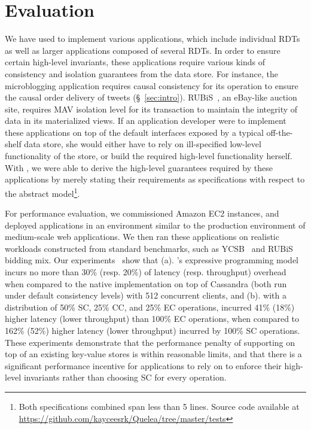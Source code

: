\section{Evaluation}
\label{sec:evaluation}

We have used \name to implement various applications, which include
individual RDTs as well as larger applications composed of several
RDTs. In order to ensure certain high-level invariants, these
applications require various kinds of consistency and isolation
guarantees from the data store. For instance, the microblogging
application requires causal consistency for its 
operation to ensure the causal order delivery of tweets
(\S~\ref{sec:intro}). RUBiS~\cite{RUBiS}, an eBay-like auction site,
requires MAV isolation level for its  transaction to
maintain the integrity of data in its materialized views. If an
application developer were to implement these applications on top of
the default interfaces exposed by a typical off-the-shelf data store,
she would either have to rely on ill-specified low-level functionality
of the store, or build the required high-level functionality herself.
With \name, we were able to derive the high-level guarantees required
by these applications by merely stating their requirements as
specifications with respect to the abstract model\footnote{Both
specifications combined span less than 5 lines. Source code available
at \url{https://github.com/kayceesrk/Quelea/tree/master/tests}}.

For performance evaluation, we commissioned Amazon EC2 instances, and
deployed \name applications in an environment similar to the
production environment of medium-scale web applications. We then ran
these applications on realistic workloads constructed from standard
benchmarks, such as YCSB~\cite{YCSB} and RUBiS bidding mix. Our
experiments~\cite{pldi15} show that (a). \name's expressive
programming model incurs no more than 30\% (resp. 20\%) of latency
(resp. throughput) overhead when compared to the native implementation
on top of Cassandra (both run under default consistency levels) with
512 concurrent clients, and (b). with a distribution of 50\% SC, 25\%
CC, and 25\% EC operations, \name incurred 41\% (18\%) higher latency
(lower throughput) than 100\% EC operations, when compared to 162\%
(52\%) higher latency (lower throughput) incurred by 100\% SC
operations. These experiments demonstrate that the performance penalty
of supporting \name on top of an existing key-value stores is within
reasonable limits, and that there is a significant performance
incentive for applications to rely on \name to enforce their
high-level invariants rather than choosing SC for every operation.
